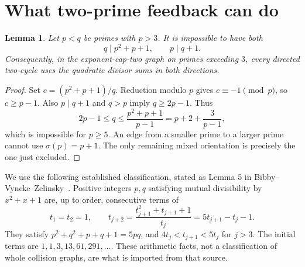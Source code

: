 \documentclass[11pt]{article}
\newtheorem{lemma}[theorem]{Lemma}
\begin{document}
\section{What two-prime feedback can do}
\begin{lemma}\label{lem:mixed}
Let $p<q$ be primes with $p>3$. It is impossible to have both
\[
 q\mid p^2+p+1,\qquad p\mid q+1.
\]
Consequently, in the exponent-cap-two graph on primes exceeding $3$, every directed two-cycle uses the quadratic divisor sums in both directions.
\end{lemma}
\begin{proof}
Set $c=(p^2+p+1)/q$. Reduction modulo $p$ gives $c\equiv-1\pmod p$, so $c\ge p-1$. Also $p\mid q+1$ and $q>p$ imply $q\ge2p-1$. Thus
\[
 2p-1\le q\le\frac{p^2+p+1}{p-1}=p+2+\frac3{p-1},
\]
which is impossible for $p\ge5$. An edge from a smaller prime to a larger prime cannot use $\sigma(p)=p+1$. The only remaining mixed orientation is precisely the one just excluded.
\end{proof}

We use the following established classification, stated as Lemma 5 in Bibby--Vyncke--Zelinsky~\cite{bibby}. Positive integers $p,q$ satisfying mutual divisibility by $x^2+x+1$ are, up to order, consecutive terms of
\begin{equation}\label{eq:sequence}
 t_1=t_2=1,\qquad
 t_{j+2}=\frac{t_{j+1}^2+t_{j+1}+1}{t_j}
         =5t_{j+1}-t_j-1.
\end{equation}
They satisfy $p^2+q^2+p+q+1=5pq$, and $4t_j<t_{j+1}<5t_j$ for $j>3$. The initial terms are $1,1,3,13,61,291,\ldots$. These arithmetic facts, not a classification of whole collision graphs, are what is imported from that source.
\end{document}
